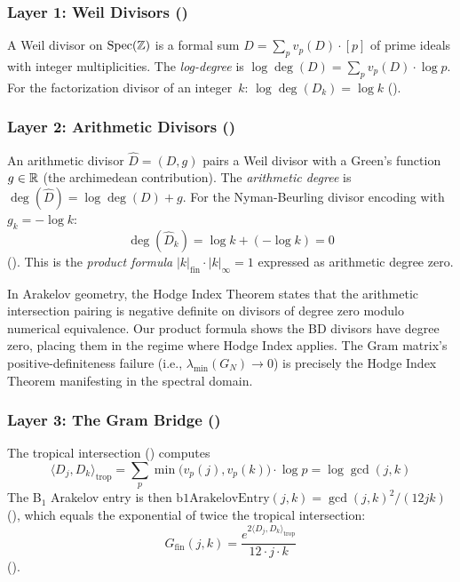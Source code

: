 \subsubsection*{Layer 1: Weil Divisors ()}

A Weil divisor on $\operatorname{Spec}(\mathbb{Z})$ is a formal sum
$D = \sum_p v_p(D) \cdot [p]$ of prime ideals with integer multiplicities.
The \emph{log-degree} is $\log\deg(D) = \sum_p v_p(D) \cdot \log p$.
For the factorization divisor of an integer~$k$:
$\log\deg(D_k) = \log k$
().

\subsubsection*{Layer 2: Arithmetic Divisors ()}

An arithmetic divisor $\hat{D} = (D, g)$ pairs a Weil divisor with a
Green's function $g \in \mathbb{R}$ (the archimedean contribution). The
\emph{arithmetic degree} is $\deg(\hat{D}) = \log\deg(D) + g$.
For the Nyman-Beurling divisor encoding with $g_k = -\log k$:
\[
  \deg(\hat{D}_k) = \log k + (-\log k) = 0
\]
(). This is the
\emph{product formula} $|k|_{\mathrm{fin}} \cdot |k|_\infty = 1$
expressed as arithmetic degree zero.

\begin{correspondence}
In Arakelov geometry, the Hodge Index Theorem states that the
arithmetic intersection pairing is negative definite on divisors
of degree zero modulo numerical equivalence. Our product formula
shows the BD divisors have degree zero, placing them in the regime
where Hodge Index applies. The Gram matrix's positive-definiteness
failure (i.e., $\lambda_{\min}(G_N) \to 0$) is precisely the
Hodge Index Theorem manifesting in the spectral domain.
\end{correspondence}

\subsubsection*{Layer 3: The Gram Bridge ()}

The tropical intersection () computes
\[
  \langle D_j, D_k \rangle_{\mathrm{trop}} = \sum_p \min\bigl(v_p(j), v_p(k)\bigr) \cdot \log p
  = \log\gcd(j,k)
\]
The B$_1$ Arakelov entry is then
$\text{b1ArakelovEntry}(j,k) = \gcd(j,k)^2 / (12jk)$
(), which equals the exponential of
twice the tropical intersection:
\[
  G_{\mathrm{fin}}(j,k) = \frac{e^{2\langle D_j, D_k \rangle_{\mathrm{trop}}}}{12 \cdot j \cdot k}
\]
().


